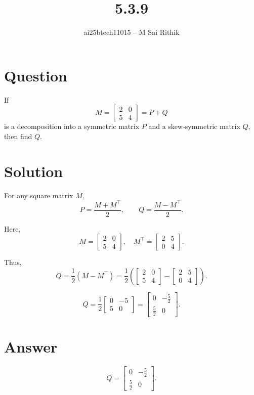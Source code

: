 \documentclass[12pt]{article}
\title{5.3.9}
\author{ai25btech11015 -- M Sai Rithik}
\date{}
\begin{document}
\maketitle

\section*{Question}
If 
\[
M = \begin{bmatrix} 2 & 0 \\ 5 & 4 \end{bmatrix} = P + Q
\]
is a decomposition into a symmetric matrix \(P\) and a skew-symmetric matrix \(Q\), then find \(Q\).

\section*{Solution}
For any square matrix \(M\),
\[
P = \frac{M + M^\top}{2}, \qquad Q = \frac{M - M^\top}{2}.
\]

Here,
\[
M = \begin{bmatrix} 2 & 0 \\ 5 & 4 \end{bmatrix}, \quad 
M^\top = \begin{bmatrix} 2 & 5 \\ 0 & 4 \end{bmatrix}.
\]

Thus,
\[
Q = \frac{1}{2}(M - M^\top)
= \frac{1}{2}\left(\begin{bmatrix} 2 & 0 \\ 5 & 4 \end{bmatrix} - \begin{bmatrix} 2 & 5 \\ 0 & 4 \end{bmatrix}\right).
\]

\[
Q = \frac{1}{2}\begin{bmatrix} 0 & -5 \\ 5 & 0 \end{bmatrix}
= \begin{bmatrix} 0 & -\tfrac{5}{2} \\ \tfrac{5}{2} & 0 \end{bmatrix}.
\]

\section*{Answer}
\[
Q = \begin{bmatrix} 0 & -\tfrac{5}{2} \\[6pt] \tfrac{5}{2} & 0 \end{bmatrix}.
\]
\end{document}
